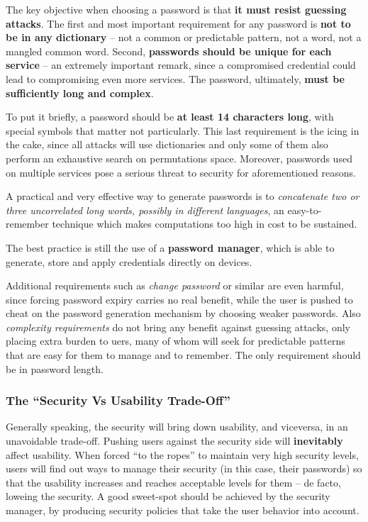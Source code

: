 \documentclass[10pt]{extbook}
\begin{document}
The key objective when choosing a password is that \textbf{it must resist
guessing attacks}. The first and most important requirement for any password is
\textbf{not to be in any dictionary} -- not a common or predictable pattern,
not a word, not a mangled common word. Second, \textbf{passwords should be
unique for each service} -- an extremely important remark, since a compromised
credential could lead to compromising even more services. The password,
ultimately, \textbf{must be sufficiently long and complex}.

To put it briefly, a password should be \textbf{at least 14 characters long},
with special symbols that matter not particularly. This last requirement is the
icing in the cake, since all attacks will use dictionaries and only some of
them also perform an exhaustive search on permutations space. Moreover,
passwords used on multiple services pose a serious threat to security for
aforementioned reasons.

A practical and very effective way to generate passwords is to
\emph{concatenate two or three uncorrelated long words, possibly in different
languages}, an easy\--to\--remember technique which makes computations too high
in cost to be sustained.

The best practice is still the use of a \textbf{password manager}, which is
able to generate, store and apply credentials directly on devices.

Additional requirements such as \emph{change password} or similar are even
harmful, since forcing password expiry carries no real benefit, while the user
is pushed to cheat on the password generation mechanism by choosing weaker
passwords. Also \emph{complexity requirements} do not bring any benefit against
guessing attacks, only placing extra burden to uers, many of whom will seek for
predictable patterns that are easy for them to manage and to remember. The only
requirement should be in password length.

\subsubsection{The ``Security Vs Usability Trade\--Off''}

Generally speaking, the security will bring down usability, and viceversa, in
an unavoidable trade\--off. Pushing users against the security side will
\textbf{inevitably} affect usability. When forced ``to the ropes'' to maintain
very high security levels, users will find out ways to manage their security
(in this case, their passwords) so that the usability increases and reaches
acceptable levels for them -- de facto, loweing the security. A good
sweet\--spot should be achieved by the security manager, by producing security
policies that take the user behavior into account.
\end{document}
